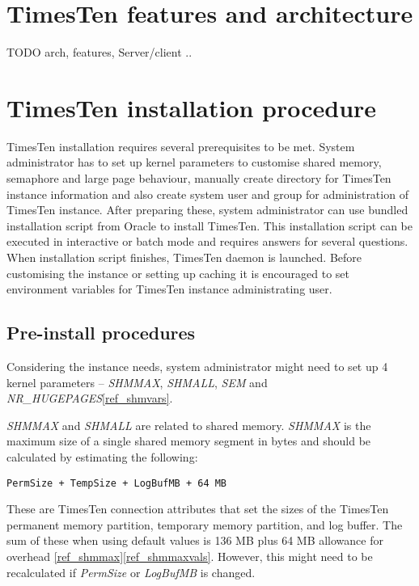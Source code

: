 \documentclass[11pt, letterpaper]{article}
\begin{document}
\newpage


\section{TimesTen features and architecture}
TODO arch, features, Server/client ..


\section{TimesTen installation procedure}
TimesTen installation requires several prerequisites to be met. System administrator has to set up kernel parameters to customise shared memory, semaphore and large page behaviour, manually create directory for TimesTen instance information and also create system user and group for administration of TimesTen instance. After preparing these, system administrator can use bundled installation script from Oracle to install TimesTen. This installation script can be executed in interactive or batch mode and requires answers for several questions. When installation script finishes, TimesTen daemon is launched. Before customising the instance or setting up caching it is encouraged to set environment variables for TimesTen instance administrating user.
\subsection{Pre-install procedures}
Considering the instance needs, system administrator might need to set up 4 kernel parameters – \emph{SHMMAX}, \emph{SHMALL}, \emph{SEM} and \emph{NR\_HUGEPAGES}\ref{ref_shmvars}.

\emph{SHMMAX} and \emph{SHMALL} are related to shared memory. \emph{SHMMAX} is the maximum size of a single shared memory segment in bytes and should be calculated by estimating the following:

\begin{lstlisting}
PermSize + TempSize + LogBufMB + 64 MB
\end{lstlisting}

These are TimesTen connection attributes that set the sizes of the TimesTen permanent memory partition, temporary memory partition, and log buffer. The sum of these when using default values is 136 MB plus 64 MB allowance for overhead \ref{ref_shmmax}\ref{ref_shmmaxvals}. However, this might need to be recalculated if \emph{PermSize} or \emph{LogBufMB} is changed.
\end{document}
